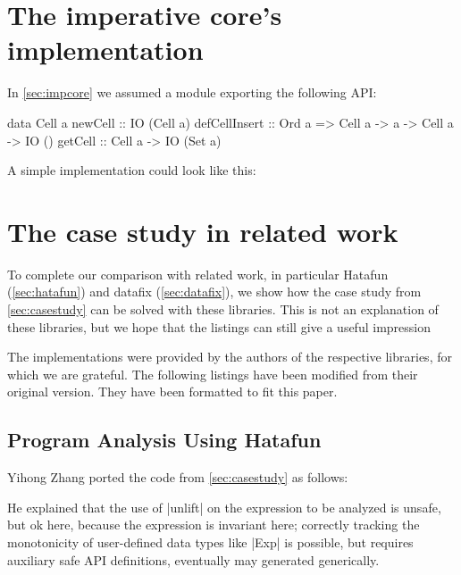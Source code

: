 \documentclass[manuscript,screen,acmsmall,nonacm]{acmart}
\begin{document}


\section{The imperative core's implementation}\label{sec:impcoreimpl}

In \cref{sec:impcore} we assumed a module exporting the following API:
\begin{code}
data Cell a
newCell        ::                                      IO (Cell a)
defCellInsert  ::  Ord a =>  Cell a -> a -> Cell a ->  IO ()
getCell        ::            Cell a ->                 IO (Set a)
\end{code}

\goodbreak

A simple implementation could look like this:


\section{The case study in related work}

To complete our comparison with related work, in particular Hatafun (\cref{sec:hatafun}) and datafix (\cref{sec:datafix}), we show how the case study from \cref{sec:casestudy} can be solved with these libraries. This is not an explanation of these libraries, but we hope that the listings can still give a useful impression

The implementations were provided by the authors of the respective libraries, for which we are grateful. The following listings have been modified from their original version. They have been formatted to fit this paper.

\subsection{Program Analysis Using Hatafun}\label{sec:hatafun-proganal}

Yihong Zhang ported the code from \cref{sec:casestudy} as follows:


He explained that the use of |unlift| on the expression to be analyzed is unsafe, but ok here, because the expression is invariant here; correctly tracking the monotonicity of user-defined data types like |Exp| is possible, but requires auxiliary safe API definitions, eventually may generated generically.
\end{document}
